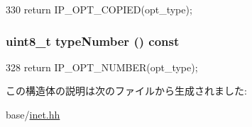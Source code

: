 \begin{DoxyCode}
330 { return IP_OPT_COPIED(opt_type); }
\end{DoxyCode}
\hypertarget{structNet_1_1IpOpt_ab6dfc174bfa7c03b65bb47a5a95635fc}{
\subsubsection[{typeNumber}]{\setlength{\rightskip}{0pt plus 5cm}uint8\_\-t typeNumber () const}}
\label{structNet_1_1IpOpt_ab6dfc174bfa7c03b65bb47a5a95635fc}



\begin{DoxyCode}
328 { return IP_OPT_NUMBER(opt_type); }
\end{DoxyCode}


この構造体の説明は次のファイルから生成されました:\begin{DoxyCompactItemize}
\item 
base/\hyperlink{inet_8hh}{inet.hh}\end{DoxyCompactItemize}
